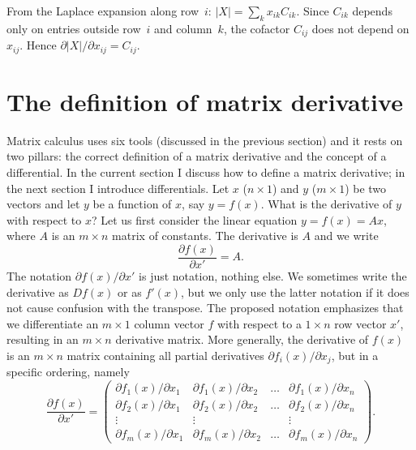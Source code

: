 \documentclass[12pt,a4paper]{article}
\makeatletter
\theoremstyle{definition}
\renewenvironment{proof}[1][\proofname]{\par
  \pushQED{\qed}%
  \normalfont \topsep6\p@\@plus6\p@\relax
  \trivlist
  \item[\hskip\labelsep\bfseries #1\@addpunct{.}]\ignorespaces
}{%
  \popQED\endtrivlist\@endpefalse
}
\makeatother
\begin{document}
\begin{proof}
From the Laplace expansion along row~$i$: $|X| = \sum_{k} x_{ik} C_{ik}$. Since $C_{ik}$ depends only on entries outside row~$i$ and column~$k$, the cofactor $C_{ij}$ does not depend on $x_{ij}$. Hence $\partial|X|/\partial x_{ij} = C_{ij}$.
\end{proof}

\section{The definition of matrix derivative}\label{sec:3}

Matrix calculus uses six tools (discussed in the previous section) and it rests on two pillars: the correct definition of a matrix derivative and the concept of a differential. In the current section I discuss how to define a matrix derivative; in the next section I introduce differentials. %
Let $x$ ($n \times 1$) and $y$ ($m \times 1$) be two vectors and let $y$ be a function of $x$, say $y = f(x)$. What is the derivative of $y$ with respect to $x$? Let us first consider the linear equation $y = f(x) = Ax$, where $A$ is an $m \times n$ matrix of constants. %
The derivative is $A$ and we write
\begin{equation}\label{eq:7}
\frac{\partial f(x)}{\partial x'} = A.
\end{equation}
The notation $\partial f(x)/\partial x'$ is just notation, nothing else. We sometimes write the derivative as $Df(x)$ or as $f'(x)$, but we only use the latter notation if it does not cause confusion with the transpose. The proposed notation emphasizes that we differentiate an $m \times 1$ column vector $f$ with respect to a $1 \times n$ row vector $x'$, resulting in an $m \times n$ derivative matrix. %
More generally, the derivative of $f(x)$ is an $m \times n$ matrix containing all partial derivatives $\partial f_i(x)/\partial x_j$, but in a specific ordering, namely
\begin{equation}\label{eq:8}
\frac{\partial f(x)}{\partial x'} = \begin{pmatrix}
\partial f_1(x)/\partial x_1 & \partial f_1(x)/\partial x_2 & \dots & \partial f_1(x)/\partial x_n \\
\partial f_2(x)/\partial x_1 & \partial f_2(x)/\partial x_2 & \dots & \partial f_2(x)/\partial x_n \\
\vdots & \vdots & & \vdots \\
\partial f_m(x)/\partial x_1 & \partial f_m(x)/\partial x_2 & \dots & \partial f_m(x)/\partial x_n
\end{pmatrix}.
\end{equation}
\end{document}
